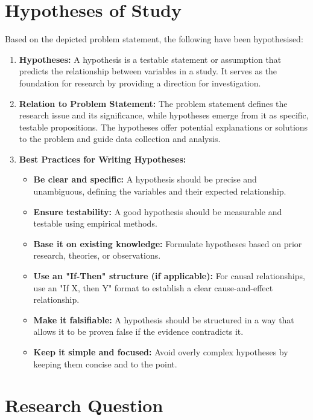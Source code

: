 \section{Hypotheses of Study}
Based on the depicted problem statement, the following have been hypothesised:

\begin{enumerate}
    \item \textbf{Hypotheses:} A hypothesis is a testable statement or assumption that predicts the relationship between variables in a study. It serves as the foundation for research by providing a direction for investigation.

    \item \textbf{Relation to Problem Statement:} The problem statement defines the research issue and its significance, while hypotheses emerge from it as specific, testable propositions. The hypotheses offer potential explanations or solutions to the problem and guide data collection and analysis.

    \item \textbf{Best Practices for Writing Hypotheses:}
    \begin{itemize}
        \item \textbf{Be clear and specific:} A hypothesis should be precise and unambiguous, defining the variables and their expected relationship.
        \item \textbf{Ensure testability:} A good hypothesis should be measurable and testable using empirical methods.
        \item \textbf{Base it on existing knowledge:} Formulate hypotheses based on prior research, theories, or observations.
        \item \textbf{Use an "If-Then" structure (if applicable):} For causal relationships, use an "If X, then Y" format to establish a clear cause-and-effect relationship.
        \item \textbf{Make it falsifiable:} A hypothesis should be structured in a way that allows it to be proven false if the evidence contradicts it.
        \item \textbf{Keep it simple and focused:} Avoid overly complex hypotheses by keeping them concise and to the point.
    \end{itemize}
\end{enumerate}



\section{Research Question}

